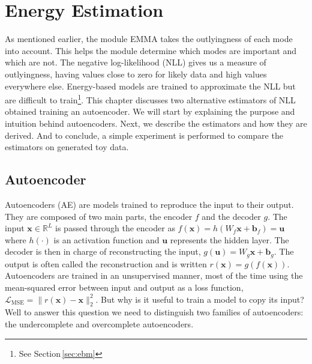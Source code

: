 \chapter{Energy Estimation} 
\label{chapter-energy-estimation} 

As mentioned earlier, the module EMMA takes the outlyingness of each mode into account. This helps the module determine which modes are important and which are not. The negative log-likelihood (NLL) gives us a measure of outlyingness, having values close to zero for likely data and high values everywhere else. Energy-based models are trained to approximate the NLL but are difficult to train\footnote{See Section\,\ref{sec:ebm}}. This chapter discusses two alternative estimators of NLL obtained training an autoencoder. We will start by explaining the purpose and intuition behind autoencoders. Next, we describe the estimators and how they are derived. And to conclude, a simple experiment is performed to compare the estimators on generated toy data. 


\section{Autoencoder}

Autoencoders (AE) are models trained to reproduce the input to their output. They are composed of two main parts, the encoder $f$ and the decoder $g$. The input $\mathbf{x} \in  \mathbb{R}^L$ is passed through the encoder as $f(\mathbf{x}) = h(W_f\mathbf{x} + \mathbf{b}_f) = \mathbf{u}$ where $h(\cdot)$ is an activation function and $\mathbf{u}$ represents the hidden layer. The decoder is then in charge of reconstructing the input, $g(\mathbf{u}) = W_g\mathbf{x} + \mathbf{b}_g$. The output is often called the reconstruction and is written  $r(\mathbf{x}) = g(f(\mathbf{x}))$. Autoencoders are trained in an unsupervised manner, most of the time using the mean-squared error between input and output as a loss function, $\mathcal{L}_{\text{MSE}} = \lVert r(\mathbf{x}) - \mathbf{x} \rVert_2^2$. But why is it useful to train a model to copy its input? Well to answer this question we need to distinguish two families of autoencoders: the undercomplete and overcomplete autoencoders.


